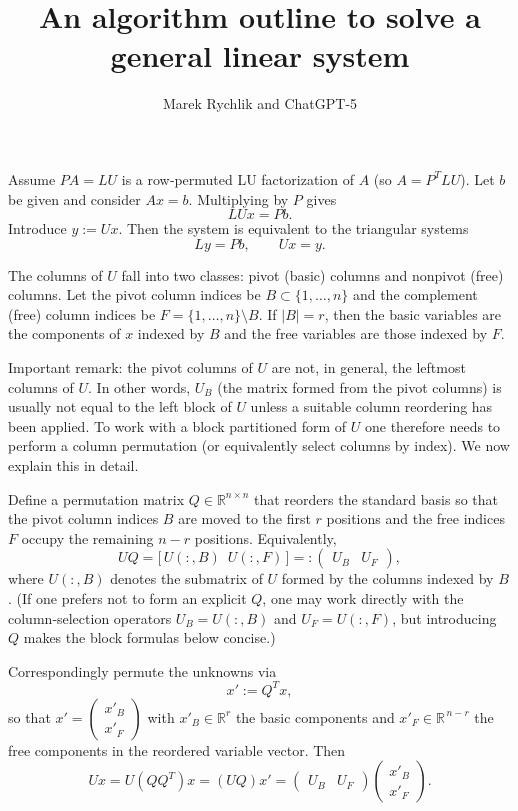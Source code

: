 \documentclass{article}
\title{An algorithm outline to solve a general linear system}
\author{Marek Rychlik and ChatGPT-5}
\begin{document}
\maketitle
Assume \(PA=LU\) is a row‑permuted LU factorization of \(A\) (so \(A=P^{T}LU\)). Let \(b\) be given and consider \(Ax=b\). Multiplying by \(P\) gives
\[
LUx=Pb.
\]
Introduce \(y:=Ux\). Then the system is equivalent to the triangular systems
\[
Ly=Pb,\qquad Ux=y.
\]

The columns of \(U\) fall into two classes: pivot (basic) columns and nonpivot (free) columns. Let the pivot column indices be \(B\subset\{1,\dots,n\}\) and the complement (free) column indices be \(F=\{1,\dots,n\}\setminus B\). If \(|B|=r\), then the basic variables are the components of \(x\) indexed by \(B\) and the free variables are those indexed by \(F\).

Important remark: the pivot columns of \(U\) are not, in general, the leftmost columns of \(U\). In other words, \(U_B\) (the matrix formed from the pivot columns) is usually not equal to the left block of \(U\) unless a suitable column reordering has been applied. To work with a block partitioned form of \(U\) one therefore needs to perform a column permutation (or equivalently select columns by index). We now explain this in detail.

Define a permutation matrix \(Q\in\mathbb{R}^{n\times n}\) that reorders the standard basis so that the pivot column indices \(B\) are moved to the first \(r\) positions and the free indices \(F\) occupy the remaining \(n-r\) positions. Equivalently,
\[
UQ = \bigl[\,U(:,B)\ \; U(:,F)\,\bigr] =: \begin{pmatrix}U_B & U_F\end{pmatrix},
\]
where \(U(:,B)\) denotes the submatrix of \(U\) formed by the columns indexed by \(B\). (If one prefers not to form an explicit \(Q\), one may work directly with the column‑selection operators \(U_B=U(:,B)\) and \(U_F=U(:,F)\), but introducing \(Q\) makes the block formulas below concise.)

Correspondingly permute the unknowns via
\[
x' := Q^{T}x,
\]
so that \(x' = \begin{pmatrix}x'_B\\ x'_F\end{pmatrix}\) with \(x'_B\in\mathbb{R}^{r}\) the basic components and \(x'_F\in\mathbb{R}^{\,n-r}\) the free components in the reordered variable vector. Then
\[
Ux = U(QQ^{T})x = (UQ)x' = \begin{pmatrix}U_B & U_F\end{pmatrix}\begin{pmatrix}x'_B\\[2pt] x'_F\end{pmatrix}.
\]
\end{document}
